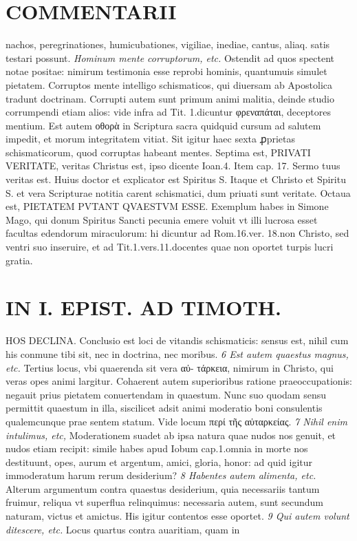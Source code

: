 \documentclass{article}
\begin{document}
\begin{pages}
\section*{COMMENTARII }
\marginpar{[ p.154 ]}\pstart nachos, peregrinationes, humicubationes, vigiliae, inediae, cantus, aliaq. satis testari possunt.  \pend
\textit{Hominum mente corruptorum, etc. }\pstart Ostendit ad quos spectent notae positae: nimirum testimonia esse reprobi hominis, quantumuis simulet pietatem. Corruptos mente intelligo schismaticos, qui diuersam ab Apostolica tradunt doctrinam. Corrupti autem sunt primum animi malitia, deinde studio corrumpendi etiam alios: vide infra ad Tit. 1.dicuntur φρεναπάται, deceptores mentium.  \pend\pstart Est autem οθορὰ in Scriptura sacra quidquid cursum ad salutem impedit, et morum integritatem vitiat. Sit igitur haec sexta ꝓprietas schismaticorum, quod corruptas habeant mentes.  \pend\pstart Septima est, PRIVATI VERITATE, veritas Christus est, ipso dicente Ioan.4. Item cap. 17. Sermo tuus veritas est. Huius doctor et explicator est Spiritus S. Itaque et Christo et Spiritu S. et vera Scripturae notitia carent schismatici, dum priuati sunt veritate.  \pend\pstart Octaua est, PIETATEM PVTANT QVAESTVM ESSE. Exemplum habes in Simone Mago, qui donum Spiritus Sancti pecunia emere voluit vt illi lucrosa esset facultas edendorum miraculorum: hi dicuntur ad Rom.16.ver. 18.non Christo, sed ventri suo inseruire, et ad Tit.1.vers.11.docentes quae non oportet turpis lucri gratia.  \pend
\section*{IN I. EPIST. AD TIMOTH. }
\marginpar{[ p.155 ]}\pstart HOS DECLINA. Conclusio est loci de vitandis schismaticis: sensus est, nihil cum his conmune tibi sit, nec in doctrina, nec moribus.  \pend
\textit{6 Est autem quaestus magnus, etc. }\pstart Tertius locus, vbi quaerenda sit vera αὐ- τάρκεια, nimirum in Christo, qui veras opes animi largitur. Cohaerent autem superioribus ratione praeoccupationis: negauit prius pietatem conuertendam in quaestum. Nunc suo quodam sensu permittit quaestum in illa, siscilicet adsit animi moderatio boni consulentis qualemcunque prae sentem statum. Vide locum περί τῆς αὐταρκείας.  \pend
\textit{7 Nihil enim intulimus, etc, }\pstart Moderationem suadet ab ipsa natura quae nudos nos genuit, et nudos etiam recipit: simile habes apud Iobum cap.1.omnia in morte nos destituunt, opes, aurum et argentum, amici, gloria, honor: ad quid igitur immoderatum harum rerum desiderium?  \pend
\textit{8 Habentes autem alimenta, etc. }\pstart Alterum argumentum contra quaestus desiderium, quia necessariis tantum fruimur, reliqua vt superflua relinquimus: necessaria autem, sunt secundum naturam, victus et amictus. His igitur contentos esse oportet.  \pend
\textit{9 Qui autem volunt ditescere, etc. }\pstart Locus quartus contra auaritiam, quam in  \pend

\end{pages}
\end{document}
